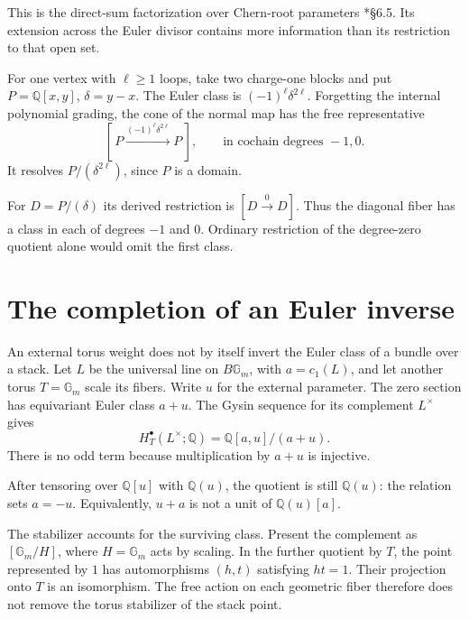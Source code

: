 This is the direct-sum factorization over Chern-root parameters
\cite{cyspec:KS}*{\S6.5}. Its extension across the Euler divisor
contains more information than its restriction to that open set.

For one vertex with $\ell\geq1$ loops, take two charge-one blocks
and put $P=\mathbb Q[x,y]$, $\delta=y-x$. The Euler class is
$(-1)^\ell\delta^{2\ell}$. Forgetting the internal polynomial grading,
the cone of the normal map has the free representative
\begin{equation}\label{cyspec:eq:direct-cone}
 [\,P\xrightarrow{(-1)^\ell\delta^{2\ell}}P\,],
 \qquad\text{in cochain degrees }-1,0.
\end{equation}
It resolves $P/(\delta^{2\ell})$, since $P$ is a domain.

For $D=P/(\delta)$ its derived restriction is
$[D\xrightarrow{0}D]$. Thus the diagonal fiber has a class in each
of degrees $-1$ and $0$. Ordinary restriction of the degree-zero
quotient alone would omit the first class.

\section{The completion of an Euler inverse}
\label{cyspec:sec:euler-completion}

An external torus weight does not by itself invert the Euler class
of a bundle over a stack. Let $L$ be the universal line on
$B\mathbb G_m$, with $a=c_1(L)$, and let another torus $T=\mathbb G_m$
scale its fibers. Write $u$ for the external parameter.
The zero section has equivariant Euler class $a+u$.
The Gysin sequence for its complement $L^\times$ gives
\begin{equation}\label{cyspec:eq:universal-line}
 H_T^\bullet(L^\times;\mathbb Q)=\mathbb Q[a,u]/(a+u).
\end{equation}
There is no odd term because multiplication by $a+u$ is injective.

After tensoring over $\mathbb Q[u]$ with $\mathbb Q(u)$, the quotient
is still $\mathbb Q(u)$: the relation sets $a=-u$.
Equivalently, $u+a$ is not a unit of $\mathbb Q(u)[a]$.

The stabilizer accounts for the surviving class. Present the
complement as $[\mathbb G_m/H]$, where $H=\mathbb G_m$ acts by
scaling. In the further quotient by $T$, the point represented
by $1$ has automorphisms $(h,t)$ satisfying $ht=1$.
Their projection onto $T$ is an isomorphism. The free action on
each geometric fiber therefore does not remove the torus
stabilizer of the stack point.

